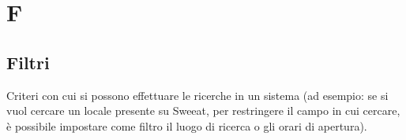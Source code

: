 \section{F}

\subsection{Filtri} Criteri con cui si possono effettuare le ricerche in un sistema (ad esempio: se si vuol cercare un locale presente su Sweeat, per restringere il campo in cui cercare, è possibile impostare come filtro il luogo di ricerca o gli orari di apertura).

\clearpage